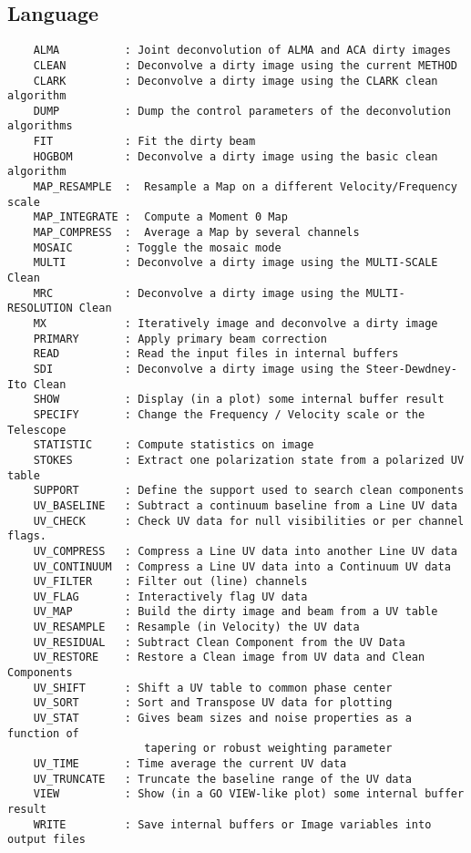 \subsection{Language}
\begin{verbatim}
    ALMA          : Joint deconvolution of ALMA and ACA dirty images
    CLEAN         : Deconvolve a dirty image using the current METHOD
    CLARK         : Deconvolve a dirty image using the CLARK clean algorithm
    DUMP          : Dump the control parameters of the deconvolution algorithms
    FIT           : Fit the dirty beam
    HOGBOM        : Deconvolve a dirty image using the basic clean algorithm
    MAP_RESAMPLE  :  Resample a Map on a different Velocity/Frequency scale
    MAP_INTEGRATE :  Compute a Moment 0 Map
    MAP_COMPRESS  :  Average a Map by several channels
    MOSAIC        : Toggle the mosaic mode
    MULTI         : Deconvolve a dirty image using the MULTI-SCALE Clean
    MRC           : Deconvolve a dirty image using the MULTI-RESOLUTION Clean
    MX            : Iteratively image and deconvolve a dirty image
    PRIMARY       : Apply primary beam correction
    READ          : Read the input files in internal buffers
    SDI           : Deconvolve a dirty image using the Steer-Dewdney-Ito Clean
    SHOW          : Display (in a plot) some internal buffer result
    SPECIFY       : Change the Frequency / Velocity scale or the Telescope
    STATISTIC     : Compute statistics on image
    STOKES        : Extract one polarization state from a polarized UV table
    SUPPORT       : Define the support used to search clean components
    UV_BASELINE   : Subtract a continuum baseline from a Line UV data
    UV_CHECK      : Check UV data for null visibilities or per channel flags.
    UV_COMPRESS   : Compress a Line UV data into another Line UV data
    UV_CONTINUUM  : Compress a Line UV data into a Continuum UV data
    UV_FILTER     : Filter out (line) channels
    UV_FLAG       : Interactively flag UV data
    UV_MAP        : Build the dirty image and beam from a UV table
    UV_RESAMPLE   : Resample (in Velocity) the UV data
    UV_RESIDUAL   : Subtract Clean Component from the UV Data
    UV_RESTORE    : Restore a Clean image from UV data and Clean Components
    UV_SHIFT      : Shift a UV table to common phase center
    UV_SORT       : Sort and Transpose UV data for plotting
    UV_STAT       : Gives beam sizes and noise properties as a function of
                     tapering or robust weighting parameter
    UV_TIME       : Time average the current UV data
    UV_TRUNCATE   : Truncate the baseline range of the UV data
    VIEW          : Show (in a GO VIEW-like plot) some internal buffer result
    WRITE         : Save internal buffers or Image variables into output files

\end{verbatim}
